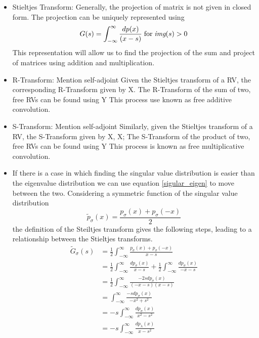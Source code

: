 \begin{itemize}
\begin{itemize}
	 	\item 
	 	Stieltjes Transform: 
	 	Generally, the projection of matrix is not given in closed form. The projection can be uniquely represented using
		\begin{equation}\label{stieltjes}
		G(s) = \int_{-\infty}^{\infty} \frac{dp(x)}{(x - s)} \; \text{for} \; \textit{img}(s) > 0
		\end{equation}	
		This representation will allow us to find the projection of the sum and project of matrices using addition and multiplication.
		\item 
		R-Transform:
		Mention self-adjoint
		Given the Stieltjes transform of a RV, the corresponding R-Transform given by 
		X. 
		The R-Transform of the sum of two, free RVs can be found using
		Y
		This process use known as free additive convolution.
		\item
		S-Transform:
		Mention self-adjoint
		Similarly, given the Stieltjes transform of a RV, the S-Transform given by 
		X, X;
		The S-Transform of the product of two, free RVs can be found using
		Y
		This process is known as free multiplicative convolution.
	 	\item 
	 	If there is a case in which finding the singular value distribution is easier than the eigenvalue distribution we can use equation  
	 	 \eqref{sigular_eigen} to move between the two. Considering a symmetric function of the singular value distribution
	 	 \begin{equation}\label{symmetric}
	 	 \tilde{p}_{\sigma}(x) = \frac{p_{\sigma}(x) + p_{\sigma}(-x)}{2}
	 	 \end{equation}
	 	 the definition of the Steiltjes transform gives the following steps, leading to a relationship between the Stieltjes transforms. 
	 	 \begin{align*}
	 	 \tilde{G}_\sigma (s) & =  \frac{1}{2} \int_{-\infty}^{\infty} \frac{p_{\sigma}(x) + p_{\sigma}(-x)}{x-s}
	 	 \\&  =  
	 	 \frac{1}{2} \int_{-\infty}^{\infty} \frac{dp_{\sigma}(x)}{x - s} + 
	 	 \frac{1}{2} \int_{-\infty}^{\infty} \frac{dp_{\sigma}(x)}{-x - s}
	 	 \\&  =  
	 	 	 	 \frac{1}{2} \int_{-\infty}^{\infty} \frac{-2s dp_{\sigma}(x)}{(-x - s)(x - s)}
	  	 \\&  =  
	 	 	 	\int_{-\infty}^{\infty} \frac{-s dp_{\sigma}(x)}{-x^2 + s^2} 	
 	 	  	 \\&  =  
 	 	 	-s  \int_{-\infty}^{\infty}  \frac{dp_{\sigma}(x)}{ x^2 - s^2} 	 
 	 	 \\&  =  
			-s  \int_{-\infty}^{\infty}  \frac{dp_{\lambda}(x)}{ x - s^2} 

\end{align*}
\end{itemize}
\end{itemize}
